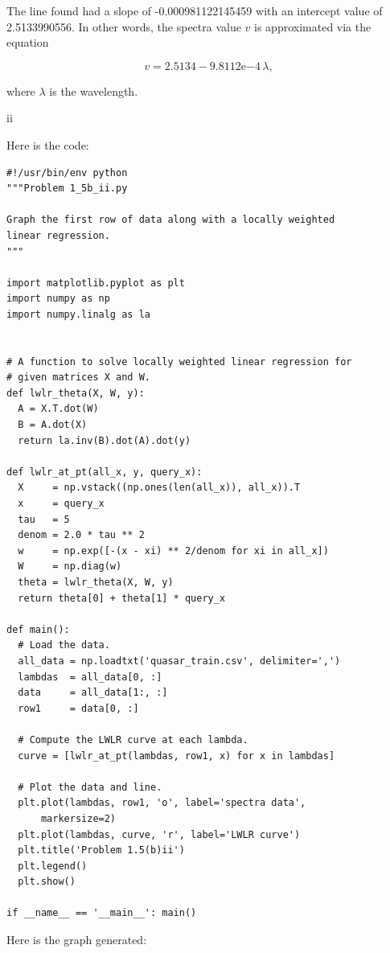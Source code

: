 \documentclass[]{article}
\begin{document}
The line found had a slope of -0.000981122145459 with an intercept value
of 2.5133990556. In other words, the spectra value \(v\) is approximated
via the equation

\[v = 2.5134 - 9.8112\mathrm{e}{-4} \, \lambda,\]

where \(\lambda\) is the wavelength.

ii

Here is the code:

\begin{verbatim}
#!/usr/bin/env python
"""Problem 1_5b_ii.py

Graph the first row of data along with a locally weighted
linear regression.
"""

import matplotlib.pyplot as plt
import numpy as np
import numpy.linalg as la


# A function to solve locally weighted linear regression for
# given matrices X and W.
def lwlr_theta(X, W, y):
  A = X.T.dot(W)
  B = A.dot(X)
  return la.inv(B).dot(A).dot(y)

def lwlr_at_pt(all_x, y, query_x):
  X     = np.vstack((np.ones(len(all_x)), all_x)).T
  x     = query_x
  tau   = 5
  denom = 2.0 * tau ** 2
  w     = np.exp([-(x - xi) ** 2/denom for xi in all_x])
  W     = np.diag(w)
  theta = lwlr_theta(X, W, y)
  return theta[0] + theta[1] * query_x

def main():
  # Load the data.
  all_data = np.loadtxt('quasar_train.csv', delimiter=',')
  lambdas  = all_data[0, :]
  data     = all_data[1:, :]
  row1     = data[0, :]

  # Compute the LWLR curve at each lambda.
  curve = [lwlr_at_pt(lambdas, row1, x) for x in lambdas]

  # Plot the data and line.
  plt.plot(lambdas, row1, 'o', label='spectra data',
      markersize=2)
  plt.plot(lambdas, curve, 'r', label='LWLR curve')
  plt.title('Problem 1.5(b)ii')
  plt.legend()
  plt.show()

if __name__ == '__main__': main()
\end{verbatim}

Here is the graph generated:
\end{document}

